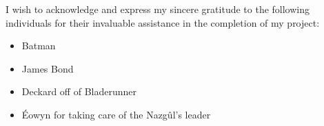 I wish to acknowledge and express my sincere gratitude to the following individuals for their invaluable assistance in the completion of my project:
\begin{itemize}
    \item Batman
    \item James Bond
    \item Deckard off of Bladerunner
    \item Éowyn for taking care of the Nazgûl's leader
\end{itemize}